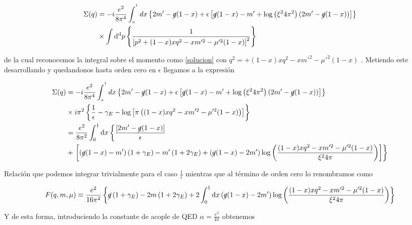 \documentclass{article}
\numberwithin{equation}{section}
\begin{document}
\begin{equation}
\begin{aligned}
\Sigma(q)&=-i\frac{e^2}{8\pi^4}\int_{_{0}}^{^{1}}dx \left\{ 2m' - \cancel{q}(1-x) + \epsilon\left[ \cancel{q}(1-x) - m' + \log\left(\xi^2 4 \pi^2\right) \left(2m' - \cancel{q}(1-x)\right)\right]\right\}\\
&\times \int\mathrm{d^d}p\left\{\frac{1}{\left[p^{2}+(1-x)xq^{2}-xm'^{2}-\mu'^{2}(1-x)\right]^{2}}\right\}
\end{aligned}
\end{equation}

de la cual reconocemos la integral sobre el momento como \ref{solucion} con $ q^2=+(1-x)xq^{2}-xm'^{2}-\mu'^{2}(1-x)  $ . Metiendo este desarrollando y quedandonos hasta orden cero en $ \epsilon $ llegamos a la expresión

\begin{equation}
\begin{aligned}
\Sigma(q)&=-i\frac{e^2}{8\pi^4}\int_{_{0}}^{^{1}}dx \left\{ 2m' - \cancel{q}(1-x) + \epsilon\left[ \cancel{q}(1-x) - m' + \log\left(\xi^2 4 \pi^2\right) \left(2m' - \cancel{q}(1-x)\right)\right]\right\}\\
&\times i\pi^2\left\{ \frac{1}{\epsilon} - \gamma_E -\log\left[\pi\left((1-x)xq^{2}-xm'^{2}-\mu'^{2}(1-x)\right)\right] \right\}\\
&=\frac{e^2}{8\pi^2}\int_{0}^{1}\mathrm{d}x \left\{ \frac{\left[2m' - \cancel{q}(1-x)\right]}{\epsilon} \right. \\
&+ \left. \left[ \left(\cancel{q}(1-x) - m' \right)\left(1+\gamma_E\right) - m'\left(1 + 2\gamma_E\right) + \left(\cancel{q}(1-x) - 2m'\right) \log \left(\frac{(1-x)xq^{2}-xm'^{2}-\mu'^{2}(1-x)}{\xi^24\pi}\right)\right] \right\}
\end{aligned}
\end{equation}

Relación que podemos integrar trivialmente para el caso $ \frac{1}{\epsilon} $ mientras que al término de orden cero lo renombramos como

\begin{equation}\label{key}
F(q,m,\mu)\equiv \frac{e^2}{16\pi^2} \left\{\cancel{q}\left(1+\gamma_E\right) - 2m\left(1+2\gamma_E\right) + 2\int_{0}^{1}\mathrm{d}x  \left(\cancel{q}(1-x) - 2m'\right) \log \left(\frac{(1-x)xq^{2}-xm'^{2}-\mu'^{2}(1-x)}{\xi^24\pi}\right)  \right\}
\end{equation}

Y de esta forma, introduciendo la constante de acople de QED $ \alpha = \frac{e^2}{4\pi} $ obtenemos
\end{document}
